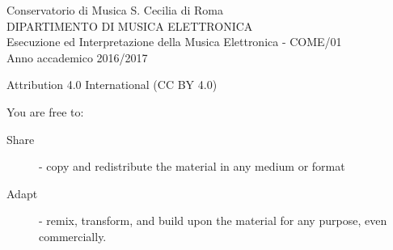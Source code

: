 \documentclass[%
			   a3paper,
			   twoside
			   ]{book}
\newcommand\frameattext[3]{%
  \linethickness{#3}%
  \AddToShipoutPicture*{%
    \AtTextLowerLeft{%
       \put(\LenToUnit{-,5\extraxsep},\LenToUnit{-0.5\extraysep}){\color{#1}%
             \rule{\dimexpr\textwidth+\extraxsep\relax}{\dimexpr\textheight+\extraysep\relax}}%
       \put(\LenToUnit{-,5\extraxsep},\LenToUnit{-0.5\extraysep}){\color{#2}%
       \framebox(\LenToUnit{\dimexpr\textwidth+\extraxsep\relax},%
                 \LenToUnit{\dimexpr\textheight+\extraysep\relax}){}
       }
    }%
  }%
}
\begin{document}
\setlength{\columnsep}{.4in}

\frameattext{white}{black}{2pt}

\begin{center}
	~
	\vfill
	
    \fontsize{19}{19}\selectfont{Giuseppe SILVI}
    	\vspace{.3in}
		\noindent\makebox[\linewidth]{\rule{.3\paperwidth}{1pt}}
	\fontsize{51}{51} \\
		\vfill %
		~
		\vfill
		
    \fontsize{19}{19}\selectfont{COME/01 \\ esecuzione ed interpretazione della \\musica elettroacustica \\ 2016/2017} \\
							     
		\vfill
	\fontsize{19}{19}\selectfont{draft 002\\ \today}
	
	\vfill
	~

\end{center}

\thispagestyle{empty}

%
%
%
%
%
%
%
%
\clearpage
\thispagestyle{empty}

Conservatorio di Musica S. Cecilia di Roma \\
DIPARTIMENTO DI MUSICA ELETTRONICA \\
Esecuzione ed Interpretazione della Musica Elettronica - COME/01 \\
Anno accademico 2016/2017
\vfill

Attribution 4.0 International (CC BY 4.0)

You are free to:
\begin{description}
	\item[Share] - copy and redistribute the material in any medium or format
	\item[Adapt] - remix, transform, and build upon the material for any purpose, even commercially.
\end{description}
\end{document}
